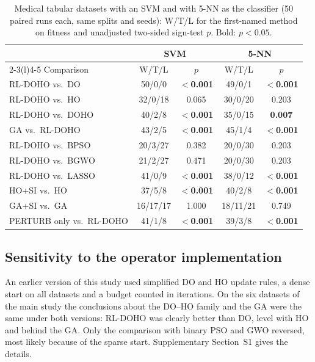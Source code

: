 \documentclass[journal]{IEEEtran}
\begin{document}
\begin{table}[t]
\centering
\caption{Medical tabular datasets with an SVM and with 5-NN as the classifier (50 paired runs each, same splits and seeds): W/T/L for the first-named method on fitness and unadjusted two-sided sign-test $p$. Bold: $p<0.05$.}
\label{tab:svm}
\footnotesize
\setlength{\tabcolsep}{2.6pt}
\begin{tabular}{@{}lcccc@{}}
\toprule
& \multicolumn{2}{c}{SVM} & \multicolumn{2}{c}{5-NN} \\
\cmidrule(lr){2-3}\cmidrule(l){4-5}
Comparison & W/T/L & $p$ & W/T/L & $p$ \\
\midrule
RL-DOHO vs.\ DO & 50/0/0 & \textbf{$<$0.001} & 49/0/1 & \textbf{$<$0.001} \\
RL-DOHO vs.\ HO & 32/0/18 & 0.065 & 30/0/20 & 0.203 \\
RL-DOHO vs.\ DOHO & 40/2/8 & \textbf{$<$0.001} & 35/0/15 & \textbf{0.007} \\
GA vs.\ RL-DOHO & 43/2/5 & \textbf{$<$0.001} & 45/1/4 & \textbf{$<$0.001} \\
RL-DOHO vs.\ BPSO & 20/3/27 & 0.382 & 20/0/30 & 0.203 \\
RL-DOHO vs.\ BGWO & 21/2/27 & 0.471 & 20/0/30 & 0.203 \\
RL-DOHO vs.\ LASSO & 41/0/9 & \textbf{$<$0.001} & 38/0/12 & \textbf{$<$0.001} \\
\midrule
HO+SI vs.\ HO & 37/5/8 & \textbf{$<$0.001} & 40/2/8 & \textbf{$<$0.001} \\
GA+SI vs.\ GA & 16/17/17 & 1.000 & 18/11/21 & 0.749 \\
PERTURB only vs.\ RL-DOHO & 41/1/8 & \textbf{$<$0.001} & 39/3/8 & \textbf{$<$0.001} \\
\bottomrule
\end{tabular}
\end{table}


\subsection{Sensitivity to the operator implementation}
An earlier version of this study used simplified DO and HO update rules, a dense start on all datasets and a budget counted in iterations. On the six datasets of the main study the conclusions about the DO--HO family and the GA were the same under both versions: RL-DOHO was clearly better than DO, level with HO and behind the GA. Only the comparison with binary PSO and GWO reversed, most likely because of the sparse start. Supplementary Section~S1 gives the details.
\end{document}
